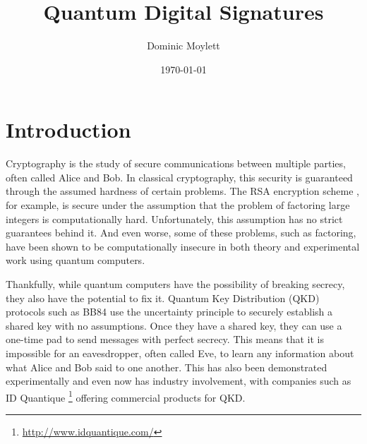 \documentclass[%
 reprint,
 amsmath,amssymb,
 aps,
 pra,
]{revtex4-1}
\begin{document}
\title{Quantum Digital Signatures}

\author{Dominic Moylett}
%

\date{\today}%

\maketitle


\section{Introduction}
\label{sec:intro}

Cryptography is the study of secure communications between multiple parties, often called Alice and Bob. In classical cryptography, this security is guaranteed through the assumed hardness of certain problems. The RSA encryption scheme \cite{Rivest:1978:MOD:359340.359342}, for example, is secure under the assumption that the problem of factoring large integers is computationally hard. Unfortunately, this assumption has no strict guarantees behind it. And even worse, some of these problems, such as factoring, have been shown to be computationally insecure in both theory \cite{Shor97} and experimental work \cite{MLL+12, 1604.05796} using quantum computers.

Thankfully, while quantum computers have the possibility of breaking secrecy, they also have the potential to fix it. Quantum Key Distribution (QKD) protocols such as BB84 \citep{BB84} use the uncertainty principle to securely establish a shared key with no assumptions. Once they have a shared key, they can use a one-time pad to send messages with perfect secrecy. This means that it is impossible for an eavesdropper, often called Eve, to learn any information about what Alice and Bob said to one another. This has also been demonstrated experimentally \cite{Bennett1992} and even now has industry involvement, with companies such as ID Quantique \footnote{\url{http://www.idquantique.com/}} offering commercial products for QKD.
\end{document}
